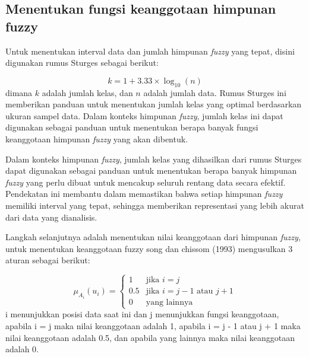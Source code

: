 \documentclass[conference]{IEEEtran}
\begin{document}
\subsection{Menentukan fungsi  keanggotaan himpunan fuzzy} \label{AA}
Untuk menentukan interval data dan jumlah himpunan \textit{fuzzy} yang tepat, disini digunakan rumus Sturges sebagai berikut:

\begin{equation}
    k = 1 + 3.33 \times \log_{10}(n)
\end{equation}
dimana $k$ adalah jumlah kelas, dan $n$ adalah jumlah data. Rumus Sturges ini memberikan panduan untuk menentukan jumlah kelas yang optimal berdasarkan ukuran sampel data. Dalam konteks himpunan \textit{fuzzy}, jumlah kelas ini dapat digunakan sebagai panduan untuk menentukan berapa banyak fungsi keanggotaan himpunan \textit{fuzzy} yang akan dibentuk.

Dalam konteks himpunan \textit{fuzzy}, jumlah kelas yang dihasilkan dari rumus Sturges dapat digunakan sebagai panduan untuk menentukan berapa banyak himpunan \textit{fuzzy} yang perlu dibuat untuk mencakup seluruh rentang data secara efektif. Pendekatan ini membantu dalam memastikan bahwa setiap himpunan \textit{fuzzy} memiliki interval yang tepat, sehingga memberikan representasi yang lebih akurat dari data yang dianalisis.



Langkah selanjutnya adalah menentukan nilai keanggotaan dari himpunan \textit{fuzzy}, untuk menentukan keanggotaan fuzzy song dan chissom (1993) mengusulkan 3 aturan sebagai berikut:

\[
\mu_{A_i}(u_i) = 
\begin{cases} 
1 & \text{jika } i = j \\
0.5 & \text{jika } i = j - 1 \text{ atau } j + 1 \\
0 & \text{yang lainnya}
\end{cases}
\]
i menunjukkan posisi data saat ini dan j menunjukkan fungsi keanggotaan, apabila i = j maka nilai keanggotaan adalah 1, apabila i = j - 1 atau j + 1 maka nilai keanggotaan adalah 0.5, dan apabila yang lainnya maka nilai keanggotaan adalah 0.
\end{document}

